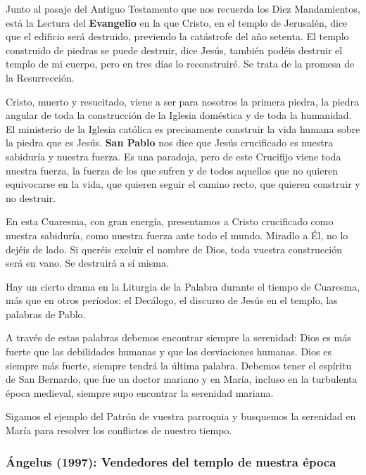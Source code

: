 \begin{body}
Junto al pasaje del Antiguo Testamento que nos recuerda los Diez Mandamientos, está la Lectura del \textbf{Evangelio} en la que Cristo, en el templo de Jerusalén, dice que el edificio será destruido, previendo la catástrofe del año setenta. El templo construido de piedras se puede destruir, dice Jesús, también podéis destruir el templo de mi cuerpo, pero en tres días lo reconstruiré. Se trata de la promesa de la Resurrección.

Cristo, muerto y resucitado, viene a ser para nosotros la primera piedra, la piedra angular de toda la construcción de la Iglesia doméstica y de toda la humanidad. El ministerio de la Iglesia católica es precisamente construir la vida humana sobre la piedra que es Jesús. \textbf{San Pablo} nos dice que Jesús crucificado es nuestra sabiduría y nuestra fuerza. Es una paradoja, pero de este Crucifijo viene toda nuestra fuerza, la fuerza de los que sufren y de todos aquellos que no quieren equivocarse en la vida, que quieren seguir el camino recto, que quieren construir y no destruir.

En esta Cuaresma, con gran energía, presentamos a Cristo crucificado como nuestra sabiduría, como nuestra fuerza ante todo el mundo. Miradlo a Él, no lo dejéis de lado. Si queréis excluir el nombre de Dios, toda vuestra construcción será en vano. Se destruirá a sí misma.

Hay un cierto drama en la Liturgia de la Palabra durante el tiempo de Cuaresma, más que en otros períodos: el Decálogo, el discurso de Jesús en el templo, las palabras de Pablo.

A través de estas palabras debemos encontrar siempre la serenidad: Dios es más fuerte que las debilidades humanas y que las desviaciones humanas. Dios es siempre más fuerte, siempre tendrá la última palabra. Debemos tener el espíritu de San Bernardo, que fue un doctor mariano y en María, incluso en la turbulenta época medieval, siempre supo encontrar la serenidad mariana.

Sigamos el ejemplo del Patrón de vuestra parroquia y busquemos la serenidad en María para resolver los conflictos de nuestro tiempo.
\end{body}


\newpage
\subsubsection{Ángelus (1997): Vendedores del templo de nuestra época}

